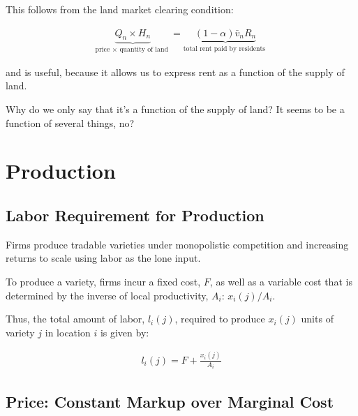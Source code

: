 \documentclass[10pt]{article}
\begin{document}
This follows from the land market clearing condition:

\begin{align}
    \underbrace{Q_n \times H_n}_{\text {price } \times \text { quantity of land }}=\underbrace{(1-\alpha) \bar{v}_n R_n}_{\text {total rent paid by residents }} \label{eq:land_market_clearing}
\end{align}

and is useful, because it allows us to express 
rent as a function of the supply of land.

\begin{questions}
    Why do we only say that it's a function of the supply of land?
    It seems to be a function of several things, no?
\end{questions}



\section{Production}

\subsection{Labor Requirement for Production}

Firms produce tradable varieties under 
monopolistic competition
and increasing returns to scale
using labor as the lone input. 

To produce a variety, firms incur 
a fixed cost, $F$, as well as a 
variable cost
that is determined by the inverse 
of local productivity, $A_i$: $x_i(j)/A_i$.

Thus, the total amount of labor, $l_i(j)$, required to produce
$x_i(j)$ units of variety $j$ in location $i$ is
given by:

\begin{align}
    l_i(j)=F+ \frac{x_i(j)}{A_i} \label{eq:labor_requirement}
\end{align}

\subsection{Price: Constant Markup over Marginal Cost}
\end{document}
